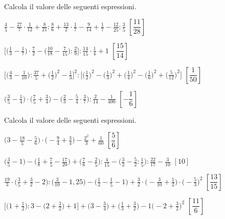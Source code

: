 \begin{esercizio}[\Ast]
\label{ese:3.146}
Calcola il valore delle seguenti espressioni.
\begin{enumeratea}
\spazielenx
\item \(\displaystyle{\frac{4}{5}-\frac{27}{7}\cdot{\frac{1}{12}}+
\frac{8}{21}:\frac{8}{6}+\frac{13}{2}\cdot
\frac{1}{7}-\frac{9}{14}+\frac{1}{7}-\frac{12}{25}:\frac{3}{5}}\)
  \hfill \(\left[\dfrac{11}{28} \right]\)
\item \(\displaystyle{\bigg[\bigg(\frac{1}{3}-\frac{1}{7}\bigg)\cdot
{\frac{7}{2}}-\bigg(\frac{10}{18}-\frac{7}{15}\bigg):\frac{2}{9}\bigg]:
\frac{14}{15}\cdot{\frac{1}{4}}+1}\)
  \hfill \(\left[\dfrac{15}{14} \right]\)
\item \(\displaystyle{\bigg[\bigg(\frac{4}{3}-\frac{1}{10}\bigg):
\frac{37}{5}+\bigg(\frac{1}{2}\bigg)^{2}-\frac{1}{3}%
\bigg]^{2}:\bigg[\bigg(\frac{1}{2}\bigg)^{2}-\bigg(\frac{1}{3}\bigg)^{2}+
\bigg(\frac{1}{4}\bigg)^{2}-%
\bigg(\frac{1}{6}\bigg)^{2}+\bigg(\frac{5}{12}\bigg)^{2}\bigg]}\)
  \hfill \(\left[\dfrac{1}{50} \right]\)
\item \(\displaystyle{\bigg(\frac{3}{5}-\frac{1}{4}\bigg)\cdot
\bigg(\frac{7}{5}+\frac{3}{4}\bigg)-\bigg(\frac{2}{3}-%
\frac{5}{4}\cdot\frac{3}{7}\bigg):\frac{2}{14}-\frac{1}{400}}\)
  \hfill \(\left[-\dfrac{1}{6} \right]\)
\end{enumeratea}
\end{esercizio}

\begin{esercizio}[\Ast]
\label{ese:3.147}
 Calcola il valore delle seguenti espressioni.
\begin{enumeratea}
\spazielenx
\item \(\displaystyle{\bigg(3-\frac{18}{5}-\frac{5}{6}\bigg)\cdot%
\bigg(-{\frac{9}{4}}+\frac{3}{4}\bigg)-\frac{2^{2}}{3}+\frac{1}{60}}\)
  \hfill \(\left[\dfrac{5}{6} \right]\)
\item \(\displaystyle{\bigg(\frac{3}{5}-1\bigg)-\bigg(\frac{1}{8}+\frac{7}{5}-
\frac{17}{20}\bigg)+%
\bigg(\frac{7}{6}-\frac{2}{5}\bigg):\frac{4}{15}-\bigg(\frac{3}{2}-\frac{5}{2}:
\frac{1}{5}\bigg):\frac{22}{17}-%
\frac{3}{10}}\)
  \hfill \(\left[10 \right]\)
\item \(\displaystyle{\frac{19}{3}\cdot\bigg(\frac{3}{5}+\frac{3}{2}-2\bigg):
\bigg(\frac{3}{10}-1,25\bigg)-%
\bigg(\frac{1}{2}-\frac{1}{5}-1\bigg)+\frac{3}{2}\cdot\bigg(-{\frac{3}{10}}+
\frac{1}{2}\bigg)\cdot%
\bigg(-{\frac{5}{3}}\bigg)^{2}}\)
  \hfill \(\left[\dfrac{13}{15} \right]\)
\item \(\displaystyle{\bigg[\bigg(1+\frac{1}{2}\bigg):3-\bigg(2+
\frac{3}{2}\bigg)+1\bigg]+\bigg(3-\frac{3}{4}\bigg)%
+\bigg(\frac{1}{3}+\frac{3}{2}\bigg)-1\bigg(-2+\frac{3}{2}\bigg)^{2}}\)
  \hfill \(\left[\dfrac{11}{6} \right]\)
\end{enumeratea}
\end{esercizio}

